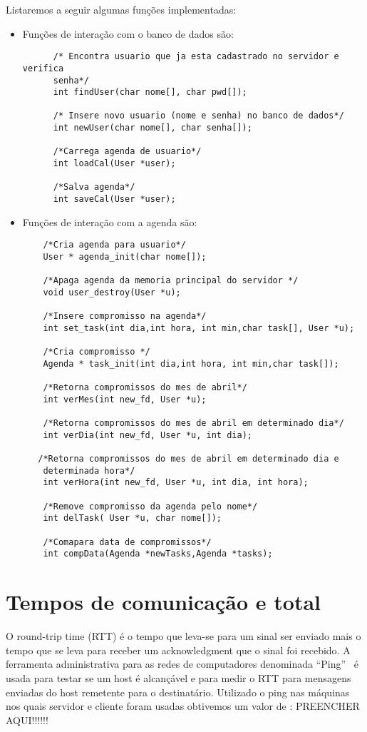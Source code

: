 \documentclass[10pt,a4paper]{article}
\begin{document}
  Listaremos a seguir algumas funções implementadas:
  \begin{itemize}
  \item  Funções de interação com o banco de dados são:
    \begin{lstlisting}
      /* Encontra usuario que ja esta cadastrado no servidor e verifica
      senha*/
      int findUser(char nome[], char pwd[]);
      
      /* Insere novo usuario (nome e senha) no banco de dados*/
      int newUser(char nome[], char senha[]);
      
      /*Carrega agenda de usuario*/
      int loadCal(User *user);
      
      /*Salva agenda*/
      int saveCal(User *user);
    \end{lstlisting}

  \item Funções de interação com a agenda  são:

  \begin{lstlisting}
    /*Cria agenda para usuario*/
    User * agenda_init(char nome[]);

    /*Apaga agenda da memoria principal do servidor */
    void user_destroy(User *u);

    /*Insere compromisso na agenda*/
    int set_task(int dia,int hora, int min,char task[], User *u);

    /*Cria compromisso */
    Agenda * task_init(int dia,int hora, int min,char task[]);

    /*Retorna compromissos do mes de abril*/
    int verMes(int new_fd, User *u);

    /*Retorna compromissos do mes de abril em determinado dia*/
    int verDia(int new_fd, User *u, int dia);
 
   /*Retorna compromissos do mes de abril em determinado dia e
    determinada hora*/
    int verHora(int new_fd, User *u, int dia, int hora);

    /*Remove compromisso da agenda pelo nome*/
    int delTask( User *u, char nome[]);

    /*Comapara data de compromissos*/
    int compData(Agenda *newTasks,Agenda *tasks);

  \end{lstlisting}

\end{itemize}


\section{Tempos de comunicação e total}
O round-trip time (RTT) é o tempo que leva-se para um sinal ser
enviado mais o tempo que se leva para receber um acknowledgment que o
sinal foi recebido. A ferramenta administrativa para as redes de
computadores denominada ``Ping''~\cite{Ping} é usada para testar se um host é alcançável e para
medir o RTT para mensagens enviadas do host remetente para o
destinatário.
Utilizado o ping nas máquinas nos quais servidor e cliente foram
usadas obtivemos um valor de : PREENCHER AQUI!!!!!!
\end{document}
